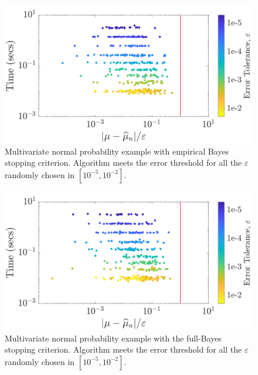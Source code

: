 \documentclass[graybox,footinfo]{svmult}
\begin{document}
\begin{figure}
\centering
\includegraphics[width=0.95\linewidth]{"figures/Sobol/Sobol_MVN_guaranteed_time_MLE__d2_r1_2019-Sep-1"}
\caption[Sobol: MVN guaranteed:EB]{Multivariate normal probability example with empirical Bayes stopping criterion.  Algorithm meets the error threshold for all the $\varepsilon$ randomly chosen in $[10^{-5}, 10^{-2}]$.}

\label{FJ:fig:Sobol-mvn-guaranteed-EB}
\end{figure}
\begin{figure}
\centering
\includegraphics[width=0.95\linewidth]{"figures/Sobol/Sobol_MVN_guaranteed_time_full__d2_r1_2019-Sep-1"}
\caption[Sobol: MVN guaranteed: Full Bayes]{Multivariate normal probability example with the full-Bayes stopping criterion. Algorithm meets the error threshold for all the $\varepsilon$ randomly chosen in $[10^{-5}, 10^{-2}]$.}
\label{FJ:fig:Sobol-mvn-guaranteed-FB}
\end{figure}
\end{document}
